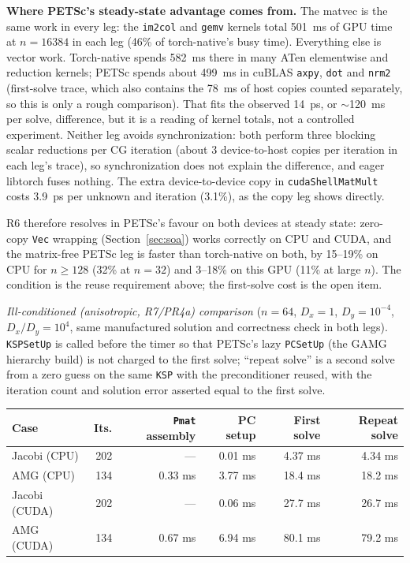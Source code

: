 \documentclass[11pt]{article}
\begin{document}
\textbf{Where PETSc's steady-state advantage comes from.} The matvec is the
same work in every leg: the \texttt{im2col} and \texttt{gemv} kernels total
501~ms of GPU time at $n=16384$ in each leg (46\% of torch-native's busy
time). Everything else is vector work. Torch-native spends 582~ms there in
many ATen elementwise and reduction kernels; PETSc spends about 499~ms in
cuBLAS \texttt{axpy}, \texttt{dot} and \texttt{nrm2} (first-solve trace,
which also contains the 78~ms of host copies counted separately, so this
is only a rough comparison). That fits the observed 14~ps, or $\sim$120~ms
per solve, difference, but it is a reading of kernel totals, not a
controlled experiment. Neither leg avoids synchronization: both perform
three blocking scalar reductions per CG iteration (about 3 device-to-host
copies per iteration in each leg's trace), so synchronization does not
explain the difference, and eager libtorch fuses nothing. The extra
device-to-device copy in \texttt{cudaShellMatMult} costs 3.9~ps per unknown
and iteration (3.1\%), as the copy leg shows directly.

R6 therefore resolves in PETSc's favour on both devices at steady state:
zero-copy \texttt{Vec} wrapping (Section~\ref{sec:soa}) works correctly on
CPU and CUDA, and the matrix-free PETSc leg is faster than torch-native on
both, by 15--19\% on CPU for $n\ge128$ (32\% at $n=32$) and 3--18\% on this GPU (11\% at large $n$). The condition is the
reuse requirement above; the first-solve cost is the open item.

\textit{Ill-conditioned (anisotropic, R7/PR4a) comparison} ($n=64$,
$D_x=1$, $D_y=10^{-4}$, $D_x/D_y=10^4$, same manufactured solution and
correctness check in both legs). \texttt{KSPSetUp} is called before the
timer so that PETSc's lazy \texttt{PCSetUp} (the GAMG hierarchy build) is
not charged to the first solve; ``repeat solve'' is a second solve from a
zero guess on the same \texttt{KSP} with the preconditioner reused, with the
iteration count and solution error asserted equal to the first solve.

\begin{center}
\footnotesize
\begin{tabular}{lrrrrr}
\toprule
Case & Its. & \texttt{Pmat} assembly & PC setup & First solve & Repeat solve \\
\midrule
Jacobi (CPU) & 202 & --- & 0.01 ms & 4.37 ms & 4.34 ms \\
AMG (CPU) & 134 & 0.33 ms & 3.77 ms & 18.4 ms & 18.2 ms \\
Jacobi (CUDA) & 202 & --- & 0.06 ms & 27.7 ms & 26.7 ms \\
AMG (CUDA) & 134 & 0.67 ms & 6.94 ms & 80.1 ms & 79.2 ms \\
\bottomrule
\end{tabular}
\end{center}
\end{document}
